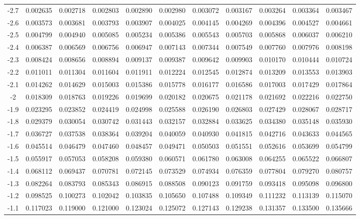 \documentclass[
]{book}
\theoremstyle{definition}
\theoremstyle{definition}
\theoremstyle{definition}
\theoremstyle{definition}
\theoremstyle{remark}
\begin{document}
\begin{longtable}[]{@{}ccccccccccc@{}}
-2.7 & 0.002635 & 0.002718 & 0.002803 & 0.002890 & 0.002980 & 0.003072 & 0.003167 & 0.003264 & 0.003364 & 0.003467 \\
-2.6 & 0.003573 & 0.003681 & 0.003793 & 0.003907 & 0.004025 & 0.004145 & 0.004269 & 0.004396 & 0.004527 & 0.004661 \\
-2.5 & 0.004799 & 0.004940 & 0.005085 & 0.005234 & 0.005386 & 0.005543 & 0.005703 & 0.005868 & 0.006037 & 0.006210 \\
-2.4 & 0.006387 & 0.006569 & 0.006756 & 0.006947 & 0.007143 & 0.007344 & 0.007549 & 0.007760 & 0.007976 & 0.008198 \\
-2.3 & 0.008424 & 0.008656 & 0.008894 & 0.009137 & 0.009387 & 0.009642 & 0.009903 & 0.010170 & 0.010444 & 0.010724 \\
-2.2 & 0.011011 & 0.011304 & 0.011604 & 0.011911 & 0.012224 & 0.012545 & 0.012874 & 0.013209 & 0.013553 & 0.013903 \\
-2.1 & 0.014262 & 0.014629 & 0.015003 & 0.015386 & 0.015778 & 0.016177 & 0.016586 & 0.017003 & 0.017429 & 0.017864 \\
-2 & 0.018309 & 0.018763 & 0.019226 & 0.019699 & 0.020182 & 0.020675 & 0.021178 & 0.021692 & 0.022216 & 0.022750 \\
-1.9 & 0.023295 & 0.023852 & 0.024419 & 0.024998 & 0.025588 & 0.026190 & 0.026803 & 0.027429 & 0.028067 & 0.028717 \\
-1.8 & 0.029379 & 0.030054 & 0.030742 & 0.031443 & 0.032157 & 0.032884 & 0.033625 & 0.034380 & 0.035148 & 0.035930 \\
-1.7 & 0.036727 & 0.037538 & 0.038364 & 0.039204 & 0.040059 & 0.040930 & 0.041815 & 0.042716 & 0.043633 & 0.044565 \\
-1.6 & 0.045514 & 0.046479 & 0.047460 & 0.048457 & 0.049471 & 0.050503 & 0.051551 & 0.052616 & 0.053699 & 0.054799 \\
-1.5 & 0.055917 & 0.057053 & 0.058208 & 0.059380 & 0.060571 & 0.061780 & 0.063008 & 0.064255 & 0.065522 & 0.066807 \\
-1.4 & 0.068112 & 0.069437 & 0.070781 & 0.072145 & 0.073529 & 0.074934 & 0.076359 & 0.077804 & 0.079270 & 0.080757 \\
-1.3 & 0.082264 & 0.083793 & 0.085343 & 0.086915 & 0.088508 & 0.090123 & 0.091759 & 0.093418 & 0.095098 & 0.096800 \\
-1.2 & 0.098525 & 0.100273 & 0.102042 & 0.103835 & 0.105650 & 0.107488 & 0.109349 & 0.111232 & 0.113139 & 0.115070 \\
-1.1 & 0.117023 & 0.119000 & 0.121000 & 0.123024 & 0.125072 & 0.127143 & 0.129238 & 0.131357 & 0.133500 & 0.135666 \\

\end{longtable}
\end{document}
